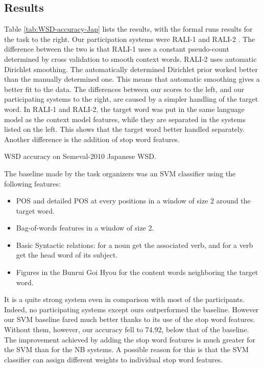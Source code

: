 \documentclass[english]{jnlp_1.4}
\begin{document}
\subsection{Results}

Table \ref{tab:WSD-accuracy-Jap} lists the results, with the formal
runs results for the task to the right. Our participation systems
were RALI-1 and RALI-2 \cite{brosseauvilleneuve-kando-nie:2010:SemEval,brosseauvilleneuve-nie-kando:2010:PAPERS}.
The diff{}erence between the two is that RALI-1 uses a constant pseudo-count
determined by cross validation to smooth context words. RALI-2 uses
automatic Dirichlet smoothing. The automatically determined Dirichlet
prior worked better than the manually determined one. This means that
automatic smoothing gives a better fit to the data. The differences
between our scores to the left, and our participating systems to the
right, are caused by a simpler handling of the target word. In RALI-1
and RALI-2, the target word was put in the same language model as
the context model features, while they are separated in the systems
listed on the left. This shows that the target word better handled
separately. Another difference is the addition of stop word features.

\begin{table}[t]
\caption{WSD accuracy on Semeval-2010 Japanese WSD.}
\label{tab:WSD-accuracy-Jap}

\end{table}

The baseline made by the task organizers was an SVM classifier using
the following features:
\begin{itemize}
\item POS and detailed POS at every positions in a window of size 2 around
the target word.
\item Bag-of-words features in a window of size 2.
\item Basic Syntactic relations: for a noun get the associated verb, and
for a verb get the head word of its subject.
\item Figures in the Bunrui Goi Hyou for the content words neighboring the
target word.
\end{itemize}
It is a quite strong system even in comparison with most of the participants.
Indeed, no participating systems except ours outperformed the baseline.
However our SVM baseline fared much better thanks to its use of the
stop word features. Without them, however, our accuracy fell to 74.92,
below that of the baseline. The improvement achieved by adding the
stop word features is much greater for the SVM than for the NB systems.
A possible reason for this is that the SVM classifier can assign different
weights to individual stop word features. 
\end{document}
